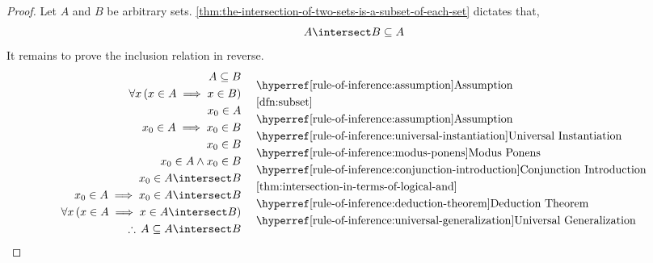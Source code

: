 \begin{proof}
    Let \( A \) and \( B \) be arbitrary sets. \cref{thm:the-intersection-of-two-sets-is-a-subset-of-each-set}
    dictates that,
    \begin{equation*}
        A \intersect B \subseteq A
    \end{equation*}
    It remains to prove the inclusion relation in reverse.
    \begin{equation*}
        \begin{aligned}
            A \subseteq B& \\
            \forall x \, \mleft( x \in A \implies x \in B \mright)& \\
            x_{0} \in A& \\
            x_{0} \in A \implies x_{0} \in B& \\
            x_{0} \in B& \\
            x_{0} \in A \land x_{0} \in B& \\
            x_{0} \in A \intersect B& \\
            x_{0} \in A \implies x_{0} \in A \intersect B& \\
            \forall x \, \mleft( x \in A \implies x \in A \intersect B \mright)& \\
            \therefore \, A \subseteq A \intersect B& \\
        \end{aligned}
        \text{  }
        \begin{aligned}
            &\quad\text{\aref{rule-of-inference:assumption}{Assumption}}\\
            &\quad\text{\cref{dfn:subset}}\\
            &\quad\text{\aref{rule-of-inference:assumption}{Assumption}}\\
            &\quad\text{\aref{rule-of-inference:universal-instantiation}{Universal Instantiation}}\\
            &\quad\text{\aref{rule-of-inference:modus-ponens}{Modus Ponens}}\\
            &\quad\text{\aref{rule-of-inference:conjunction-introduction}{Conjunction Introduction}}\\
            &\quad\text{\cref{thm:intersection-in-terms-of-logical-and}}\\
            &\quad\text{\aref{rule-of-inference:deduction-theorem}{Deduction Theorem}}\\
            &\quad\text{\aref{rule-of-inference:universal-generalization}{Universal Generalization}}\\

\end{aligned}
\end{equation*}
\end{proof}
